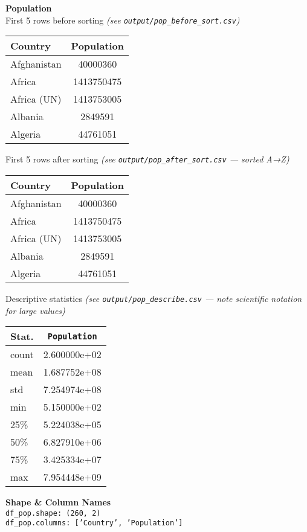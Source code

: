 \documentclass[14pt]{extarticle}
\begin{document}
\textbf{Population}\\
First 5 rows before sorting \textit{(see \texttt{output/pop\_before\_sort.csv})}
\begin{center}
\begin{tabular}{ |l|c| }
  \hline
  Country&Population\\
  \hline
  Afghanistan&40000360\\
  Africa&1413750475\\
  Africa (UN)&1413753005\\
  Albania&2849591\\
  Algeria&44761051\\
  \hline
\end{tabular}
\end{center}
First 5 rows after sorting \textit{(see \texttt{output/pop\_after\_sort.csv} — sorted A→Z)}
\begin{center}
\begin{tabular}{ |l|c| }
  \hline
  Country&Population\\
  \hline
  Afghanistan&40000360\\
  Africa&1413750475\\
  Africa (UN)&1413753005\\
  Albania&2849591\\
  Algeria&44761051\\
  \hline
\end{tabular}
\end{center}
Descriptive statistics \textit{(see \texttt{output/pop\_describe.csv} — note scientific notation for large values)}
\begin{center}
  \begin{tabular}{ |l|c| }
    \hline
    Stat.&\texttt{Population}\\\hline
    count&2.600000e+02            \\
    mean &1.687752e+08             \\
    std  &7.254974e+08              \\
    min  &5.150000e+02              \\
    25\% &5.224038e+05             \\
    50\% &6.827910e+06    \\
    75\% &3.425334e+07             \\
    max  &7.954448e+09              \\
    \hline
\end{tabular}
\end{center}
\textbf{Shape \& Column Names}\\
{\footnotesize\texttt{df\_pop.shape: (260, 2)\\
df\_pop.columns: ['Country', 'Population']}}
\end{document}
